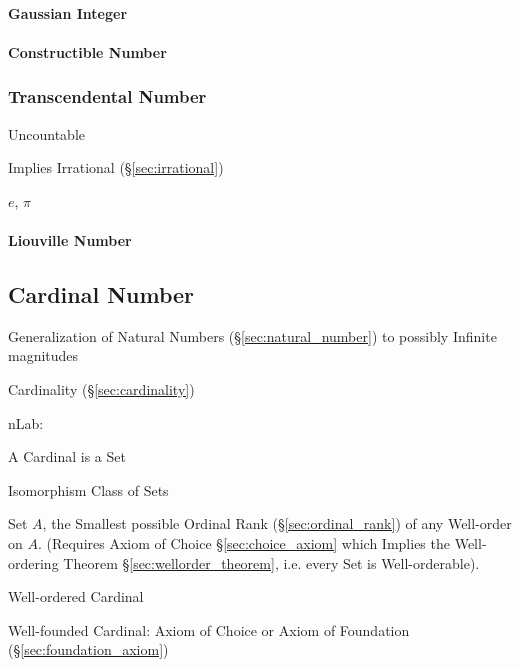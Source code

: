 \paragraph{Gaussian Integer}\label{sec:gaussian_integer}\hfill

\paragraph{Constructible Number}\label{sec:constructible_number}\hfill



\subsubsection{Transcendental Number}\label{sec:transcendental}

Uncountable

Implies Irrational (\S\ref{sec:irrational})

$e$, $\pi$



\paragraph{Liouville Number}\label{sec:liouville_number}\hfill



\subsection{Cardinal Number}\label{sec:cardinal_number}

Generalization of Natural Numbers (\S\ref{sec:natural_number}) to
possibly Infinite magnitudes %

Cardinality (\S\ref{sec:cardinality})

nLab:

A Cardinal is a Set

Isomorphism Class of Sets

Set $A$, the Smallest possible Ordinal Rank (\S\ref{sec:ordinal_rank})
of any Well-order on $A$. (Requires Axiom of Choice
\S\ref{sec:choice_axiom} which Implies the Well-ordering Theorem
\S\ref{sec:wellorder_theorem}, i.e. every Set is Well-orderable).

Well-ordered Cardinal

Well-founded Cardinal: Axiom of Choice or Axiom of Foundation
(\S\ref{sec:foundation_axiom})

